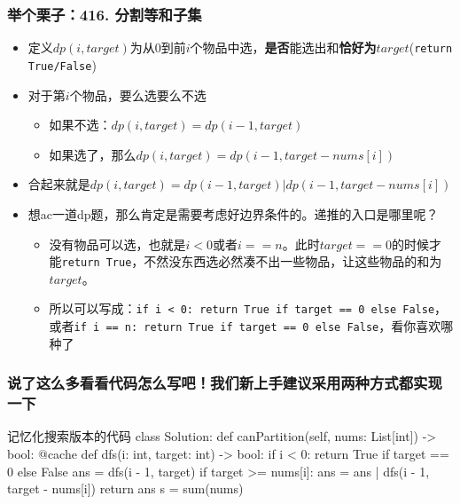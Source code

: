 \begin{frame}[fragile]          %
  \frametitle{\textsc{举个栗子：416. 分割等和子集}}
  \begin{itemize}
    \item 定义$dp(i,target)$为从0到前$i$个物品中选，\textbf{是否}能选出和\textbf{恰好为$target$}(\lstinline{return True/False})
    \item 对于第$i$个物品，要么选要么不选
        \begin{itemize}
          \item 如果不选：$dp(i,target)=dp(i-1,target)$
          \item 如果选了，那么$dp(i,target)=dp(i-1,target-nums[i])$
        \end{itemize}
    \item 合起来就是$dp(i,target)=dp(i-1,target) | dp(i-1,target-nums[i])$
    \item 想ac一道dp题，那么肯定是需要考虑好边界条件的。递推的入口是哪里呢？  
         \begin{itemize}
          \item 没有物品可以选，也就是$i<0$或者$i==n$。此时$target==0$的时候才能\lstinline{return True}，不然没东西选必然凑不出一些物品，让这些物品的和为$target$。
          \item 所以可以写成：\lstinline{if i < 0: return True if target == 0 else False}，或者\lstinline{if i == n: return True if target == 0 else False}，看你喜欢哪种了
         \end{itemize}
  \end{itemize}
\end{frame}


\begin{frame}[fragile]          %
  \frametitle{说了这么多看看代码怎么写吧！我们新上手建议采用两种方式都实现一下}
  \begin{codeblock}[language=python]{记忆化搜索版本的代码}
class Solution:
def canPartition(self, nums: List[int]) -> bool:
  @cache
  def dfs(i: int, target: int) -> bool:
      if i < 0:
          return True if target == 0 else False
      ans = dfs(i - 1, target)
      if target >= nums[i]:
          ans = ans | dfs(i - 1, target - nums[i])
      return ans
  s = sum(nums)

  \end{codeblock}
\end{frame}


